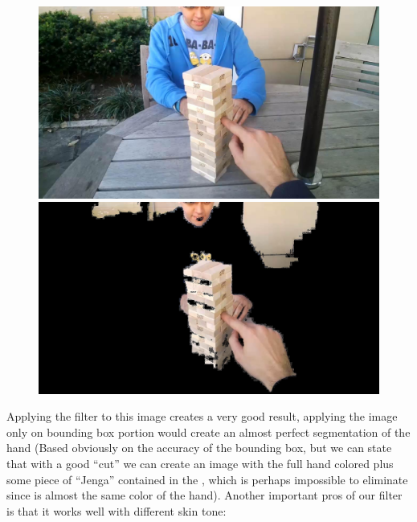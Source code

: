\begin{center}
    \begin{figure}[!htb]
        \begin{minipage}{0.5\textwidth}
            \centering
            \includegraphics[scale=0.21]{images/unused_seg/20.jpg}
        \end{minipage}
        \begin{minipage}{0.5\textwidth}
            \centering
            \includegraphics[scale=0.21]{images/unused_seg/20m.jpg} 
        \end{minipage}
    \end{figure}
\end{center}
Applying the filter to this image creates a very good result, applying the image only on bounding box portion would create an almost perfect segmentation of the hand (Based obviously on the accuracy of the bounding box, but we can state that with a good “cut” we can create an image with the full hand colored plus some piece of “Jenga” contained in the , which is perhaps impossible to eliminate since is almost the same color of the hand).
\newline
Another important pros of our filter is that it works well with different skin tone:

